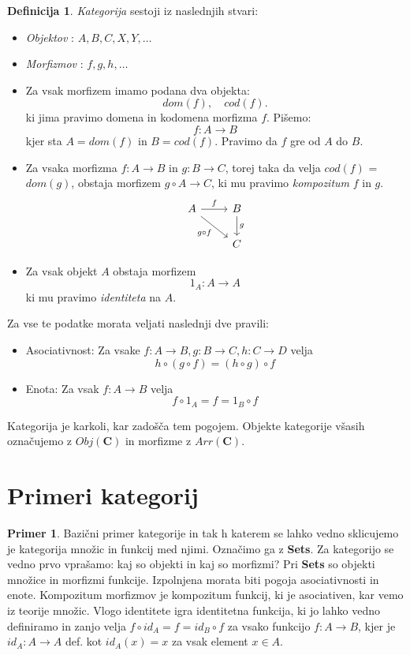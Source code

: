 \documentclass[12pt,a4paper]{book}
\theoremstyle{definition}
\newtheorem{definicija}{Definicija}[chapter]
\theoremstyle{plain}
\theoremstyle{definition}
\newtheorem{primer}{Primer}[section]
\theoremstyle{remark}
\newcommand{\cat}[1]{\textbf{#1}}
\begin{document}
\begin{definicija}
\emph{Kategorija} sestoji iz naslednjih stvari:
\begin{itemize}
\item \emph{Objektov} : $A,B,C,X,Y,\ldots$
\item \emph{Morfizmov} : $f,g,h,\ldots$
\item Za vsak morfizem imamo podana dva objekta: $$dom(f), \quad cod(f).$$
ki jima pravimo domena in kodomena morfizma $f$. Pišemo:
$$f\colon A \to B$$
kjer sta $A = dom(f)$ in $B = cod(f)$.
Pravimo da $f$ gre od $A$ do $B$.
\item Za vsaka morfizma $f \colon A \to B$ in $g \colon B \to C$, torej taka da velja $cod(f)$ = $dom(g)$, obstaja morfizem $g\circ A \to C$, ki mu pravimo \emph{kompozitum} $f$ in $g$.
%
\[
\begin{tikzcd}
A \arrow[r, "f"] \arrow[rd, "g \circ f"']  & B  \arrow[d, "g"] \\
				& C
\end{tikzcd}
\] 
%
\item Za vsak objekt $A$ obstaja morfizem
$$1_A : A \to A$$
ki mu pravimo \emph{identiteta} na $A$.		
\end{itemize}
Za vse te podatke morata veljati naslednji dve pravili:
\begin{itemize}
\item Asociativnost: Za vsake $f : A \to B, g : B \to C, h : C \to D$ velja
$$h \circ (g \circ f) = (h \circ g) \circ f$$
\item Enota: Za vsak $f : A \to B$ velja
$$f \circ 1_A = f = 1_B \circ f$$
\end{itemize}
\end{definicija}
%
Kategorija je karkoli, kar zadošča tem pogojem.
Objekte kategorije všasih označujemo z $Obj(\cat{C})$ in morfizme z $Arr(\cat{C})$.

\section{Primeri kategorij}

\begin{primer}
Bazični primer kategorije in tak h katerem se lahko vedno sklicujemo je kategorija množic in funkcij med njimi. Označimo ga z \cat{Sets}. Za kategorijo se vedno prvo vprašamo: kaj so objekti in kaj so morfizmi? Pri \textbf{Sets} so objekti množice in morfizmi funkcije.
Izpolnjena morata biti pogoja asociativnosti in enote.
Kompozitum morfizmov je kompozitum funkcij, ki je asociativen, kar vemo iz teorije množic.
Vlogo identitete igra identitetna funkcija, ki jo lahko vedno definiramo in zanjo velja $f \circ id_A = f = id_B \circ f$ za vsako funkcijo $f : A \to B$, kjer je $id_A : A \to A$ def. kot $id_A(x) = x$ za vsak element $x \in A$.
\end{primer}
\end{document}
